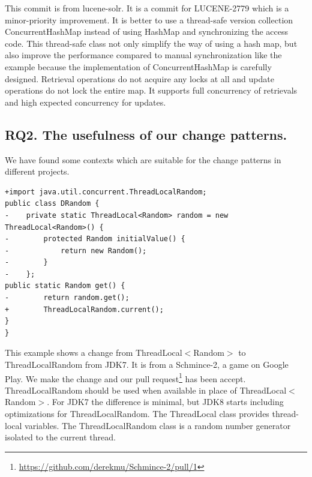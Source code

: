 This commit is from lucene-solr. It is a commit for LUCENE-2779 which is a minor-priority improvement. It is better to use a thread-safe version collection ConcurrentHashMap instead of using HashMap and synchronizing the access code. This thread-safe class not only simplify the way of using a hash map, but also improve the performance compared to manual synchronization like the example because the implementation of ConcurrentHashMap is carefully designed. Retrieval operations do not acquire any locks at all and update operations do not lock the entire map. It supports full concurrency of retrievals and high expected concurrency for updates.

%
%
%
%
%
%

\subsection{RQ2. The usefulness of our change patterns.}
\label{sec:result:sample}



 We have found some contexts which are suitable for the change patterns in different projects.

\begin{lstlisting}
+import java.util.concurrent.ThreadLocalRandom;
public class DRandom {
-    private static ThreadLocal<Random> random = new ThreadLocal<Random>() {
-        protected Random initialValue() {
-            return new Random();
-        }
-    };
public static Random get() {
-        return random.get();
+        ThreadLocalRandom.current();
}
}
\end{lstlisting}

This example shows a change from ThreadLocal$<$Random$>$ to ThreadLocalRandom from JDK7. It is from a Schmince-2, a game on Google Play. We make the change and our pull request\footnote{\url{https://github.com/derekmu/Schmince-2/pull/1}} has been accept. ThreadLocalRandom should be used when available in place of ThreadLocal$<$Random$>$. For JDK7 the difference is minimal, but JDK8 starts including optimizations for ThreadLocalRandom. The ThreadLocal class provides thread-local variables. The ThreadLocalRandom class is a random number generator isolated to the current thread.

